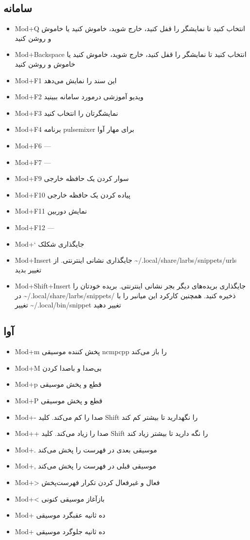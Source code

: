 \documentclass{article}
\newcommand{\s}[1]{\textenglish{Mod+#1}}
\begin{document}
\subsection{سامانه}
\begin{itemize}
	\item \s{Q} انتخاب کنید تا نمایشگر را قفل کنید، خارج شوید، خاموش کنید یا خاموش و روشن کنید
	\item \s{Backspace} انتخاب کنید تا نمایشگر را قفل کنید، خارج شوید، خاموش کنید یا خاموش و روشن کنید
	\item \s{F1} این سند را نمایش می‌دهد
	\item \s{F2} ویدیو آموزشی درمورد سامانه ببینید
	\item \s{F3} نمایشگرتان را انتخاب کنید
	\item \s{F4} برنامه pulsemixer برای مهار آوا
	\item \s{F6} ---
	\item \s{F7} ---
	\item \s{F9} سوار کردن یک حافظه خارجی
	\item \s{F10} پیاده کردن یک حافظه خارجی
	\item \s{F11} نمایش دوربین
	\item \s{F12} ---
	\item \s{`} جایگذاری شکلک
	\item \s{Insert} جایگذاری نشانی اینترنتی. از \textenglish{\textasciitilde/.local/share/larbs/snippets/urls} تغییر بدید
	\item \s{Shift+Insert} جایگذاری بریده‌های دیگر بجر نشانی اینترنتی. بریده خودتان را در \textenglish{\textasciitilde/.local/share/larbs/snippets/} ذخیره کنید. همچنین کارکرد این میانبر را با تغییر \textenglish{\textasciitilde/.local/bin/snippet} تغییر دهید
\end{itemize}
\subsection{آوا}
\begin{itemize}
	\item \s{m} پخش کننده موسیقی ncmpcpp را باز می‌کند
	\item \s{M} بی‌صدا و باصدا کردن
	\item \s{p} قطع و پخش موسیقی
	\item \s{P} قطع و پخش موسیقی
	\item \s{-} صدا را کم می‌کند. کلید Shift را نگهدارید تا بیشتر کم کند
	\item \s{+} صدا را زیاد می‌کند. کلید Shift را نگه دارید تا بیشتر زیاد کند
	\item \s{.} موسیقی بعدی در قهرست را پخش می‌کند
	\item \s{,} موسیقی قبلی در فهرست را پخش می‌کند
	\item \s{>} فعال و غیرفعال کردن تکرار فهرست‌پخش
	\item \s{<} بازآغاز موسیقی کنونی
	\item \s{\lbrack} ده ثانیه عقبگرد موسیقی
	\item \s{\rbrack} ده ثانیه جلوگرد موسیقی
\end{itemize}
\end{document}
